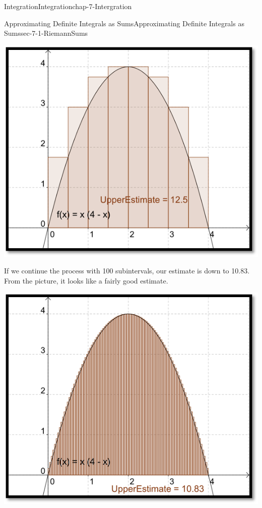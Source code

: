 \documentclass[oneside,10pt,]{book}
\numberwithin{equation}{section}
\begin{document}
\begin{chapterptx}{Integration}{}{Integration}{}{}{chap-7-Intergration}
\begin{sectionptx}{Approximating Definite Integrals as Sums}{}{Approximating Definite Integrals as Sums}{}{}{sec-7-1-RiemannSums}
\begin{sidebyside}{1}{0.2}{0.2}{0}
\begin{sbspanel}{0.6}
\includegraphics[width=1\linewidth]{images/sec7-1-5.png}
\end{sbspanel}%
\end{sidebyside}%
\par
\hypertarget{p-2553}{}%
If we continue the process with 100 subintervals, our estimate is down to 10.83.  From the picture, it looks like a fairly good estimate.%
\begin{sidebyside}{1}{0.2}{0.2}{0}%
\begin{sbspanel}{0.6}%
\includegraphics[width=1\linewidth]{images/sec7-1-6.png}

\end{sbspanel}
\end{sidebyside}
\end{sectionptx}
\end{chapterptx}
\end{document}
